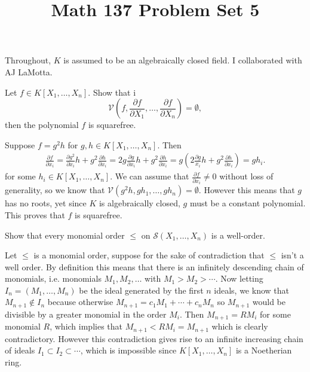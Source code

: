 \documentclass[11pt,letterpaper]{article}
\title{\textbf{Math 137 Problem Set 5}}
\begin{document}
\maketitle

Throughout, $K$ is assumed to be an algebraically closed field. I collaborated with AJ LaMotta. 

\begin{problem}
    Let $f\in K[X_1,\dots,X_n]$. Show that i
    \[
    \mathcal V\left(f,\frac{\partial f}{\partial X_1},\dots,\frac{\partial f}{\partial X_n}\right) = \emptyset,
    \]
    then the polynomial $f$ is squarefree.
\end{problem}

\begin{solution}
    Suppose $f=g^2h$ for $g,h\in K[X_1, \ldots, X_n]$. Then
    \[
        \begin{aligned}
            \frac{\partial f}{\partial x_i} = \frac{\partial g^2}{\partial x_i}h+g^2\frac{\partial h}{\partial x_i} = 2g\frac{\partial g}{\partial x_i}h + g^2\frac{\partial h}{\partial x_i}=g\left(2\frac{\partial g}{x_i}h + g^2\frac{\partial h}{\partial x_i}\right)=gh_i.
        \end{aligned}
    \] 
    for some $h_i\in K[X_1,\ldots,X_n]$. We can assume that $\frac{\partial f}{\partial x_i}\neq 0$ without loss of generality, so we know that $\mathcal V(g^2h, gh_1, \ldots, gh_n)=\emptyset$. However this means that $g$ has no roots, yet since $K$ is algebraically closed, $g$ must be a constant polynomial. This proves that $f$ is squarefree.
\end{solution}

\begin{problem}
    Show that every monomial order $\leq$ on $\mathcal S(X_1,\dots,X_n)$ is a well-order.
\end{problem}

\begin{solution}
    Let $\leq$ is a monomial order, suppose for the sake of contradiction that $\leq$ isn't a well order. By definition this means that there is an infinitely descending chain of monomials, i.e. monomials $M_1,M_2,\ldots$ with $M_1 > M_2 > \cdots$. Now letting $I_n = (M_1,\ldots,M_n)$ be the ideal generated by the first $n$ ideals, we know that $M_{n+1}\not\in I_n$ because otherwise $M_{n+1}=c_1M_1+\cdots+c_nM_n$ so $M_{n+1}$ would be divisible by a greater monomial in the order $M_i$. Then $M_{n+1}=RM_i$ for some monomial $R$, which implies that $M_{n+1}< RM_i=M_{n+1}$ which is clearly contradictory. However this contradiction gives rise to an infinite increasing chain of ideals $I_1\subset I_2\subset \cdots$, which is impossible since $K[X_1,\ldots,X_n]$ is a Noetherian ring.
\end{solution}
\end{document}
